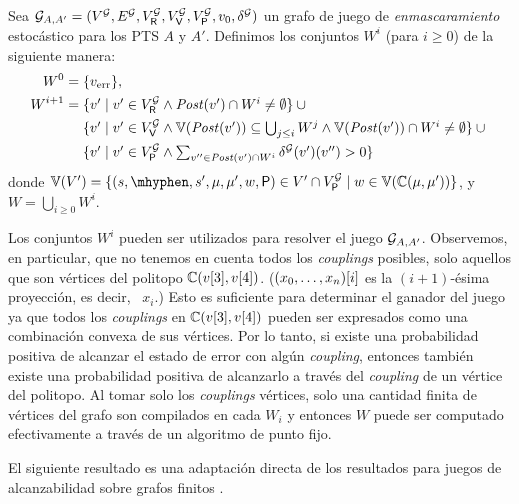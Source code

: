 \begin{definition}\label{def:W}
  Sea
  $\StochG_{A,A'} = (V^\StochG, E^\StochG, V^\StochG_\Refuter, V^\StochG_\Verifier, V^\StochG_\Probabilistic, \InitVertex, \delta^\StochG)$
  un grafo de juego de \emph{enmascaramiento} estocástico para los PTS $A$ y $A'$.
  Definimos los conjuntos $W^i$ (para $i \geq 0$) de la siguiente manera:
  {%
  \begin{align*}
    W^0= {} & \{\ErrorSt\}, \\
    W^{i+1} = {}
    & \textstyle
      \{v' \mid v' \in V^\StochG_\Refuter \wedge \post(v') \cap W^i \neq \emptyset \} \cup {} \\
    & \textstyle
      \{v' \mid {v' \in V^\StochG_\Verifier} \wedge  {\vertices{\post(v')} \subseteq  \bigcup_{j \leq i}W^{j}} \wedge {\vertices{\post(v')} \cap W^i \neq \emptyset} \} \cup {} \\
    & \textstyle
      \{v' \mid v' \in V^\StochG_\Probabilistic \wedge \sum_{v'' \in \post(v') \cap W^i} \delta^\StochG(v')(v'') > 0 \}
  \end{align*}
  }%
  donde
  $\vertices{V'}= \{ (s, \mhyphen, s', \mu, \mu', w, \Probabilistic) \in V' \cap V^\StochG_\Probabilistic \mid w \in \vertices{\couplings{\mu}{\mu'}}\}$, y
  $W = \bigcup_{i  \geq 0} W^i$.
\end{definition}
%
Los conjuntos $W^i$ pueden ser utilizados para resolver el juego $\StochG_{A,A'}$.
Observemos, en particular, que no tenemos en cuenta todos los \emph{couplings} posibles, solo aquellos que son vértices del politopo
$\couplings{\pr{3}{v}}{\pr{4}{v}}$. ($\pr{i}{(x_0,\dots,x_n)}$ es la $(i+1)$-ésima proyección, es decir, \ $x_i$.)
%
Esto es suficiente para determinar el ganador del juego ya que todos los \emph{couplings} en $\couplings{\pr{3}{v}}{\pr{4}{v}}$ pueden ser expresados como una combinación convexa de sus vértices.  Por lo tanto, si existe una probabilidad positiva de alcanzar el estado de error con algún \emph{coupling}, entonces también existe una probabilidad positiva de alcanzarlo a través del \emph{coupling} de un vértice del politopo.
%
Al tomar solo los \emph{couplings} vértices, solo una cantidad finita de vértices del grafo son compilados en cada $W_i$ y entonces $W$ puede ser computado efectivamente a través de un algoritmo de punto fijo.

El siguiente resultado es una adaptación directa de los resultados para juegos de alcanzabilidad sobre grafos finitos \cite{ChatterjeeH12}.
	
